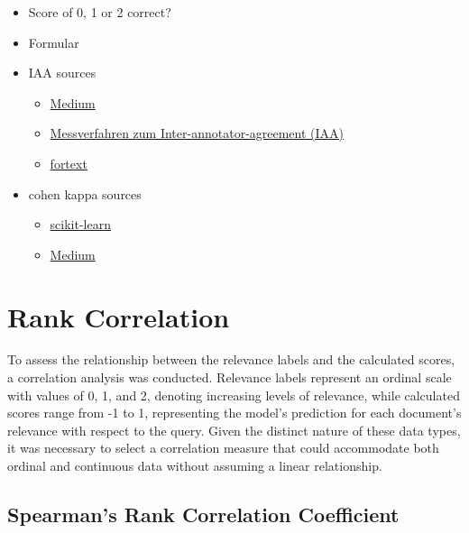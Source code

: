 \begin{itemize}
    \item Score of 0, 1 or 2 correct?
    \item Formular
    \item IAA sources
    \begin{itemize}
        \item \href{https://medium.com/@prasanNH/inter-annotator-agreement-in-natural-language-processing-f65685a22816}{Medium}
        \item \href{https://publications.goettingen-research-online.de/bitstream/2/111141/1/DWP44_Konle-IAA-Metriken.pdf}{Messverfahren zum Inter-annotator-agreement (IAA)}
        \item \href{https://fortext.net/ueber-fortext/glossar/inter-annotator-agreement-iaa}{fortext}
    \end{itemize}
    \item cohen kappa sources
    \begin{itemize}
        \item \href{https://scikit-learn.org/dev/modules/generated/sklearn.metrics.cohen_kappa_score.html}{scikit-learn}
        \item \href{https://surge-ai.medium.com/inter-annotator-agreement-an-introduction-to-cohens-kappa-statistic-dcc15ffa5ac4}{Medium}
    \end{itemize}
\end{itemize}

\section{Rank Correlation}\label{rank-correlation}  

To assess the relationship between the relevance labels and the calculated scores, a correlation analysis was conducted. Relevance labels represent an ordinal scale with values of 0, 1, and 2, denoting increasing levels of relevance, while calculated scores range from -1 to 1, representing the model's prediction for each document's relevance with respect to the query. Given the distinct nature of these data types, it was necessary to select a correlation measure that could accommodate both ordinal and continuous data without assuming a linear relationship.

\subsection{Spearman's Rank Correlation Coefficient}\label{spearmans-rank-correlation-coefficient}

